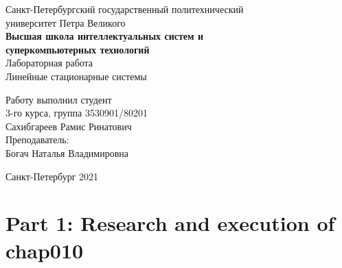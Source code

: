 \documentclass[a4paper]{article}
\begin{document}
    \begin{center}
        \begin{center}
        \hfill \break
        \normalsize{Санкт-Петербургский государственный политехнический}\\
        \normalsize{университет Петра Великого}\\
        \hfill \break
        \normalsize{\textbf{Высшая школа интеллектуальных систем и}}\\ 
        \normalsize{\textbf{суперкомпьютерных технологий}}\\ 
        \hfill \break
        \hfill \break
        \hfill \break
        \normalsize{Лабораторная работа}\\
        \hfill \break
        \hfill \break
        \normalsize{\LARGE Линейные стационарные системы}\\
        \end{center}
        \hfill \break
        \hfill \break
        \hfill \break
        \hfill \break
        \hfill \break
        \hfill \break
        \hfill \break
        \hfill \break
        \hfill \break
        \hfill \break
        \begin{flushright}
            \normalsize{Работу выполнил студент}\\
            \normalsize{3-го курса, группа 3530901/80201}\\
            \normalsize{Сахибгареев Рамис Ринатович}\\
            \hfill \break
            \normalsize{Преподаватель:}\\
            \normalsize{Богач Наталья Владимировна}\\
        \end{flushright}
        \hfill \break
        \hfill \break
        \hfill \break
        \hfill \break
        \begin{center} Санкт-Петербург 2021 \end{center}
        \thispagestyle{empty}
    \end{center}
    
    \newpage
        \tableofcontents
    
    \newpage
         \listoffigures
    
    \newpage
         \lstlistoflistings   
     
    \newpage
        \section{Part 1: Research and execution of chap010}
        
\end{document}
